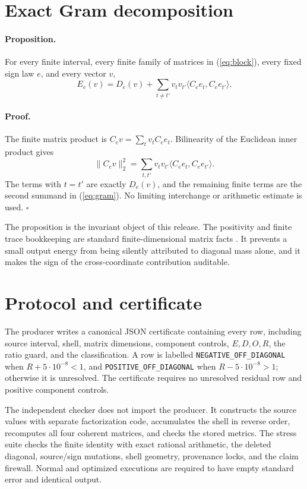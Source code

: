 \documentclass[10pt]{article}
\newcommand{\1}{\mathbf 1}
\begin{document}
\section{Exact Gram decomposition}

\paragraph{Proposition.}
For every finite interval, every finite family of matrices in
(\ref{eq:block}), every fixed sign law $e$, and every vector $v$,
\begin{equation}\label{eq:gram}
 E_e(v)=D_e(v)+
 \sum_{t\ne t'}v_tv_{t'}
 \langle C_ee_t,C_ee_{t'}\rangle.
\end{equation}

\paragraph{Proof.}
The finite matrix product is
$C_ev=\sum_t v_tC_ee_t$.  Bilinearity of the Euclidean inner product gives
\[
 \|C_ev\|_2^2
 =\sum_{t,t'}v_tv_{t'}
   \langle C_ee_t,C_ee_{t'}\rangle.
\]
The terms with $t=t'$ are exactly $D_e(v)$, and the remaining finite terms
are the second summand in (\ref{eq:gram}).  No limiting interchange or
arithmetic estimate is used. \hfill$\square$

The proposition is the invariant object of this release.  The positivity and
finite trace bookkeeping are standard finite-dimensional matrix facts
\cite{horn2013matrix}.  It prevents a
small output energy from being silently attributed to diagonal mass alone,
and it makes the sign of the cross-coordinate contribution auditable.

\section{Protocol and certificate}

The producer writes a canonical JSON certificate containing every row,
including source interval, shell, matrix dimensions, component controls,
$E,D,O,R$, the ratio guard, and the classification.  A row is labelled
\texttt{NEGATIVE\_OFF\_DIAGONAL} when $R+5\cdot10^{-8}<1$, and
\texttt{POSITIVE\_OFF\_DIAGONAL} when $R-5\cdot10^{-8}>1$; otherwise it is
unresolved.  The certificate requires no unresolved residual row and positive
component controls.

The independent checker does not import the producer.  It constructs the
source values with separate factorization code, accumulates the shell in
reverse order, recomputes all four coherent matrices, and checks the stored
metrics.  The stress suite checks the finite identity with exact rational
arithmetic, the deleted diagonal, source/sign mutations, shell geometry,
provenance locks, and the claim firewall.  Normal and optimized executions
are required to have empty standard error and identical output.
\end{document}
